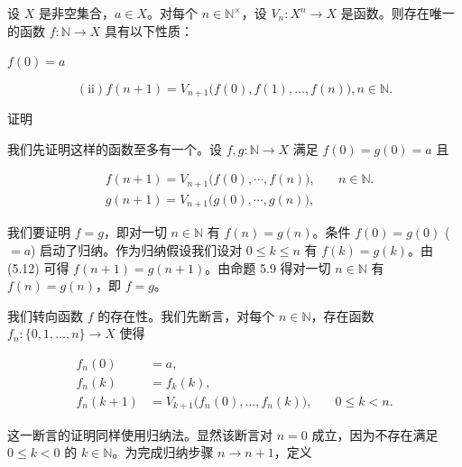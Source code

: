\begin{proposition}

设 $ X $ 是非空集合，$ a \in X $。对每个 $ n \in \mathbb{N}^\times $，设 $ V_n: X^n \to X $ 是函数。则存在唯一的函数 $ f: \mathbb{N} \to X $ 具有以下性质：

\begin{subitems}
\item

$ f(0)=a $

\begin{equation}
\mathrm{(i i)}f(n+1)=V_{n+1}\bigl(f(0),f(1),\ldots,f(n)\bigr),n\in\mathbb{N}.
\end{equation}
\end{subitems}

证明

\begin{items}
\item

我们先证明这样的函数至多有一个。设 $ f, g: \mathbb{N} \to X $ 满足 $ f(0) = g(0) = a $ 且

\begin{equation*}
\begin{aligned}
&f(n+1)=V_{n+1}\big(f(0),\cdots,f(n)\big),\quad&n\in\mathbb{N}.\\&g(n+1)=V_{n+1}\big(g(0),\cdots,g(n)\big),
\end{aligned}
\end{equation*}

我们要证明 $f = g$，即对一切 $n \in \mathbb{N}$ 有 $f(n) = g(n)$。条件 $f(0) = g(0)$ ($= a$) 启动了归纳。作为归纳假设我们设对 $0 \leq k \leq n$ 有 $f(k) = g(k)$。由 (5.12) 可得 $f(n+1) = g(n+1)$。由命题 5.9 得对一切 $n \in \mathbb{N}$ 有 $f(n) = g(n)$，即 $f = g$。

\item

我们转向函数 $ f $ 的存在性。我们先断言，对每个 $ n \in \mathbb{N} $，存在函数 $ f_n: \{0,1,\ldots,n\} \to X $ 使得

\begin{equation*}
\begin{aligned}
f_{n}(0)&=a,\\f_{n}(k)&=f_{k}(k),\\f_{n}(k+1)&=V_{k+1}\big(f_{n}(0),\ldots,f_{n}(k)\big),\quad&0\leq k<n.
\end{aligned}
\end{equation*}

这一断言的证明同样使用归纳法。显然该断言对 $ n = 0 $ 成立，因为不存在满足 $ 0 \leq k < 0 $ 的 $ k \in \mathbb{N} $。为完成归纳步骤 $ n \to n + 1 $，定义


\end{items}
\end{proposition}

